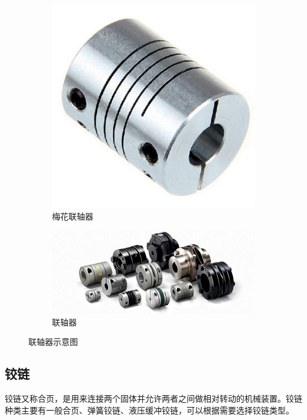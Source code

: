 \documentclass[UTF8]{article} %
\begin{document}
\begin{figure}[H]
  \centering
  \begin{subfigure}[b]{0.25\textwidth}
         \centering
         \includegraphics[width=\textwidth]{lian1.png}
          \caption{梅花联轴器}
  \end{subfigure}
  \quad
  \begin{subfigure}[b]{0.3\textwidth}
          \centering
          \includegraphics[width=\textwidth]{lian2.png}
          \caption{联轴器}
  \end{subfigure}
  \caption{联轴器示意图}
\end{figure}

\subsection{铰链}
铰链又称合页，是用来连接两个固体并允许两者之间做相对转动的机械装置。铰链种类主要有一般合页、弹簧铰链、液压缓冲铰链，可以根据需要选择铰链类型。
\end{document}
